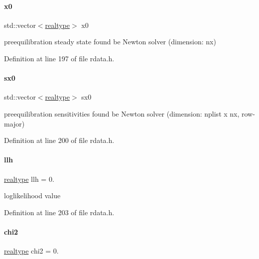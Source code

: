\paragraph{\texorpdfstring{x0}{x0}}
{\footnotesize\ttfamily std\+::vector$<$\mbox{\hyperlink{namespaceamici_a1bdce28051d6a53868f7ccbf5f2c14a3}{realtype}}$>$ x0}

preequilibration steady state found be Newton solver (dimension\+: nx) 

Definition at line 197 of file rdata.\+h.

\mbox{\label{classamici_1_1_return_data_a83cf74df5a7fee8ee66f882b898e7b63}} 
\paragraph{\texorpdfstring{sx0}{sx0}}
{\footnotesize\ttfamily std\+::vector$<$\mbox{\hyperlink{namespaceamici_a1bdce28051d6a53868f7ccbf5f2c14a3}{realtype}}$>$ sx0}

preequilibration sensitivities found be Newton solver (dimension\+: nplist x nx, row-\/major) 

Definition at line 200 of file rdata.\+h.

\mbox{\label{classamici_1_1_return_data_a35c3d895b14746807521fa6ba8ead52b}} 
\paragraph{\texorpdfstring{llh}{llh}}
{\footnotesize\ttfamily \mbox{\hyperlink{namespaceamici_a1bdce28051d6a53868f7ccbf5f2c14a3}{realtype}} llh = 0.}

loglikelihood value 

Definition at line 203 of file rdata.\+h.

\mbox{\label{classamici_1_1_return_data_a473f438e422f5fbf6c5753a95b3324fe}} 
\paragraph{\texorpdfstring{chi2}{chi2}}
{\footnotesize\ttfamily \mbox{\hyperlink{namespaceamici_a1bdce28051d6a53868f7ccbf5f2c14a3}{realtype}} chi2 = 0.}

